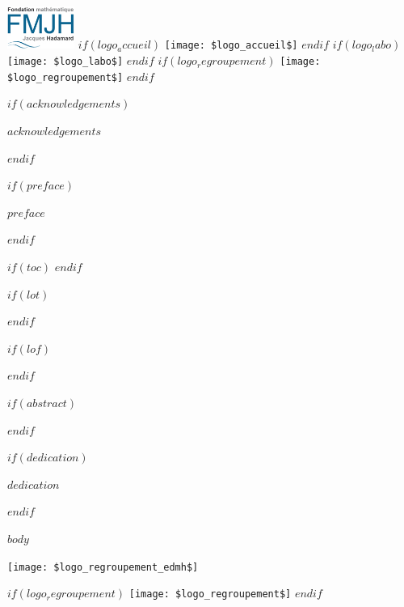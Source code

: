 \documentclass[a4paper,12pt]{reedthesis}
\begin{document}
\vfill
\noindent
\hfill
\hbox{\includegraphics[width=2.2cm]{logos/fmjh.jpg}}
$if(logo_accueil)$
\hfill\hfill\hfill\hfill
\hbox{\texttt{[image: \$logo\_accueil\$]}}
$endif$
$if(logo_labo)$
\hfill\hfill\hfill\hfill
\hbox{\texttt{[image: \$logo\_labo\$]}}
$endif$
$if(logo_regroupement)$
\hfill\hfill\hfill\hfill
\texttt{[image: \$logo\_regroupement\$]}
$endif$
\hfill
\


\frontmatter %
\pagestyle{empty} %

$if(acknowledgements)$
  \begin{acknowledgements}
    $acknowledgements$
  \end{acknowledgements}
$endif$

$if(preface)$
  \begin{preface}
    $preface$
  \end{preface}
$endif$

$if(toc)$
  \hypersetup{linkcolor=$if(toccolor)$$toccolor$$else$black$endif$}
  \setcounter{tocdepth}{$toc-depth$}
  \tableofcontents
$endif$

$if(lot)$
  \listoftables
$endif$

$if(lof)$
  \listoffigures
$endif$

$if(abstract)$
  \begin{abstract}
    $abstract$
  \end{abstract}
$endif$

$if(dedication)$
  \begin{dedication}
    $dedication$
  \end{dedication}
$endif$

\mainmatter %
\pagestyle{fancyplain} %

$body$


\newpage
\pagestyle{empty}
\hbox{\texttt{[image: \$logo\_regroupement\_edmh\$]}}


\bigskip
\noindent{}

\bigskip
\noindent{}

\vfill
$if(logo_regroupement)$
\hfill
\texttt{[image: \$logo\_regroupement\$]}
$endif$
\end{document}

